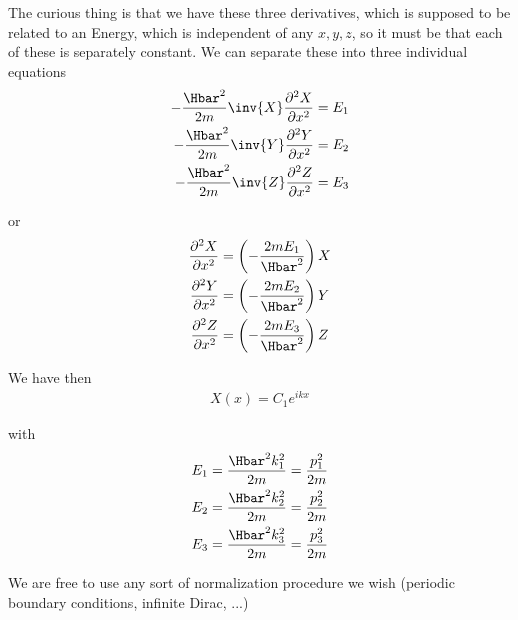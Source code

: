 The curious thing is that we have these three derivatives, which is supposed to be related to an Energy, which is independent of any \(x,y,z\), so it must be that each of these is separately constant.  We can separate these into three individual equations
%
\begin{equation}\label{eqn:lecture5BigReviewCh4FreeParticle:140}
\begin{aligned}
-\frac{\Hbar^2}{2m} \inv{X} \frac{\partial^2 X}{\partial {x}^2} &= E_1 \\
-\frac{\Hbar^2}{2m} \inv{Y} \frac{\partial^2 Y}{\partial {x}^2} &= E_2 \\
-\frac{\Hbar^2}{2m} \inv{Z} \frac{\partial^2 Z}{\partial {x}^2} &= E_3
\end{aligned}
\end{equation}

or
\begin{equation}\label{eqn:lecture5BigReviewCh4FreeParticle:160}
\begin{aligned}
\frac{\partial^2 X}{\partial {x}^2} &= \left( - \frac{2m E_1}{\Hbar^2} \right) X  \\
\frac{\partial^2 Y}{\partial {x}^2} &= \left( - \frac{2m E_2}{\Hbar^2} \right) Y  \\
\frac{\partial^2 Z}{\partial {x}^2} &= \left( - \frac{2m E_3}{\Hbar^2} \right) Z
\end{aligned}
\end{equation}

We have then
%
\begin{equation}\label{eqn:lecture5BigReviewCh4FreeParticle:180}
\begin{aligned}
X(x) = C_1 e^{i k x}
\end{aligned}
\end{equation}

with
\begin{equation}\label{eqn:lecture5BigReviewCh4FreeParticle:200}
\begin{aligned}
E_1 &= \frac{\Hbar^2 k_1^2 }{2m} = \frac{p_1^2}{2m} \\
E_2 &= \frac{\Hbar^2 k_2^2 }{2m} = \frac{p_2^2}{2m} \\
E_3 &= \frac{\Hbar^2 k_3^2 }{2m} = \frac{p_3^2}{2m}
\end{aligned}
\end{equation}

We are free to use any sort of normalization procedure we wish (periodic boundary conditions, infinite Dirac, ...)

